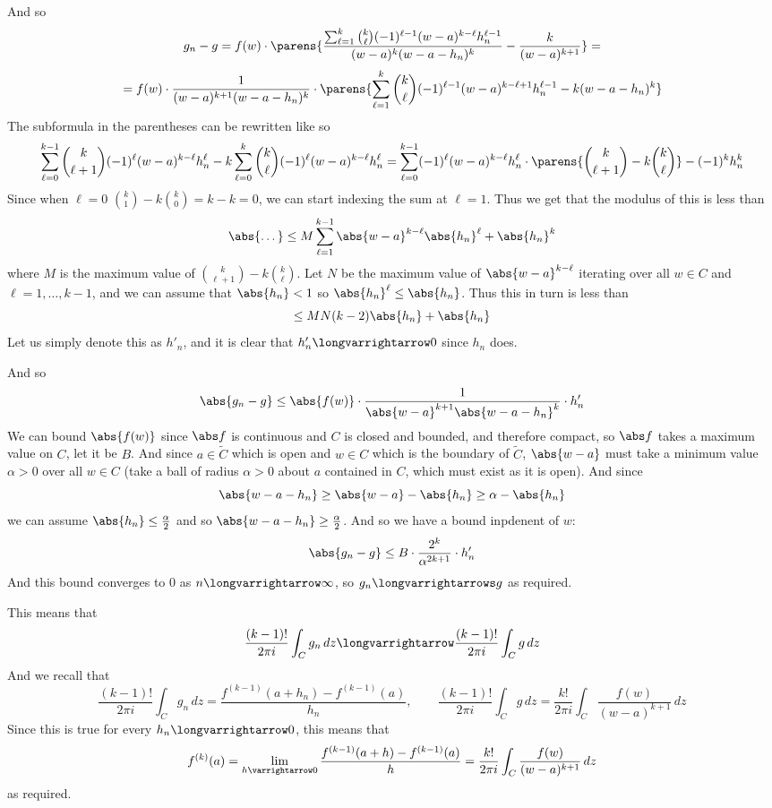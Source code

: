 \documentclass[10pt]{article}
\let\longto=\longvarrightarrow
\let\to=\varrightarrow
\begin{document}
    And so
    \[ g_n - g = f(w)\cdot\parens{\frac{\sum_{\ell=1}^k\binom k\ell (-1)^{\ell-1}(w-a)^{k-\ell}h_n^{\ell-1}}{(w-a)^k(w-a-h_n)^k} - \frac k{(w-a)^{k+1}}} = \]
    \[ = f(w)\cdot\frac1{(w-a)^{k+1}(w-a-h_n)^k}\cdot\parens{\sum_{\ell=1}^k\binom k\ell (-1)^{\ell-1}(w-a)^{k-\ell+1}h_n^{\ell-1} - k(w-a-h_n)^k} \]
    The subformula in the parentheses can be rewritten like so
    \[ \sum_{\ell=0}^{k-1}\binom k{\ell+1}(-1)^\ell(w-a)^{k-\ell}h_n^\ell - k\sum_{\ell=0}^k\binom k\ell(-1)^\ell(w-a)^{k-\ell}h_n^\ell =
    \sum_{\ell=0}^{k-1}(-1)^\ell(w-a)^{k-\ell}h_n^\ell\cdot\parens{\binom k{\ell+1}-k\binom k\ell} - (-1)^kh_n^k \]
    Since when $\ell=0$ $\binom k1-k\binom k0=k-k=0$, we can start indexing the sum at $\ell=1$.
    Thus we get that the modulus of this is less than
    \[ \abs{\dots} \leq M\sum_{\ell=1}^{k-1}\abs{w-a}^{k-\ell}\abs{h_n}^\ell + \abs{h_n}^k \]
    where $M$ is the maximum value of $\binom k{\ell+1}-k\binom k\ell$.
    Let $N$ be the maximum value of $\abs{w-a}^{k-\ell}$ iterating over all $w\in C$ and $\ell=1,\dots,k-1$, and we can assume that $\abs{h_n}<1$ so $\abs{h_n}^\ell\leq\abs{h_n}$.
    Thus this in turn is less than
    \[ \leq MN(k-2)\abs{h_n} + \abs{h_n} \]
    Let us simply denote this as $h'_n$, and it is clear that $h'_n\longto0$ since $h_n$ does.

    And so
    \[ \abs{g_n-g} \leq \abs{f(w)}\cdot\frac1{\abs{w-a}^{k+1}\abs{w-a-h_n}^k}\cdot h'_n \]
    We can bound $\abs{f(w)}$ since $\abs f$ is continuous and $C$ is closed and bounded, and therefore compact, so $\abs f$ takes a maximum value on $C$, let it be $B$.
    And since $a\in\tilde C$ which is open and $w\in C$ which is the boundary of $\tilde C$, $\abs{w-a}$ must take a minimum value $\alpha>0$ over all $w\in C$ (take a ball of radius $\alpha>0$ about
    $a$ contained in $C$, which must exist as it is open).
    And since
    \[ \abs{w-a-h_n} \geq \abs{w-a} - \abs{h_n} \geq \alpha - \abs{h_n} \]
    we can assume $\abs{h_n}\leq\frac\alpha2$ and so $\abs{w-a-h_n}\geq\frac\alpha2$.
    And so we have a bound inpdenent of $w$:
    \[ \abs{g_n-g} \leq B\cdot\frac{2^k}{\alpha^{2k+1}}\cdot h'_n \]
    And this bound converges to $0$ as $n\longto\infty$, so $g_n\longvarrightarrows g$ as required.

    This means that
    \[ \frac{(k-1)!}{2\pi i}\int_C g_n\,dz \longto \frac{(k-1)!}{2\pi i}\int_C g\,dz \]
    And we recall that
    \[ \frac{(k-1)!}{2\pi i}\int_C g_n\,dz = \frac{f^{(k-1)}(a+h_n) - f^{(k-1)}(a)}{h_n},\qquad \frac{(k-1)!}{2\pi i}\int_C g\,dz = \frac{k!}{2\pi i}\int_C \frac{f(w)}{(w-a)^{k+1}}\,dz \]
    Since this is true for every $h_n\longto0$, this means that
    \[ f^{(k)}(a) = \lim_{h\to0} \frac{f^{(k-1)}(a+h) - f^{(k-1)}(a)}h = \frac{k!}{2\pi i}\int_C \frac{f(w)}{(w-a)^{k+1}}\,dz \]
    as required.
\end{document}
